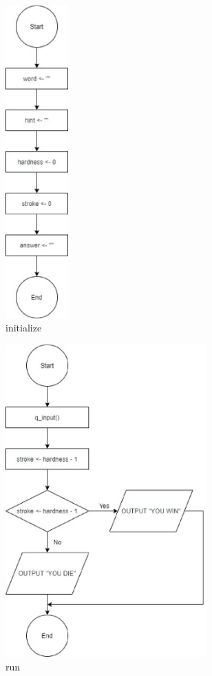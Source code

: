 \documentclass{article}
\begin{document}
        \begin{figure}[htbp]
            \centering
            \includegraphics[height = 12cm]{flowchart/initialize.eps}
            \caption{initialize}
        \end{figure}
                    
        \begin{figure}[htbp]
            \centering
            \includegraphics[height = 12cm]{flowchart/run.eps}
            \caption{run}
        \end{figure}
\end{document}
